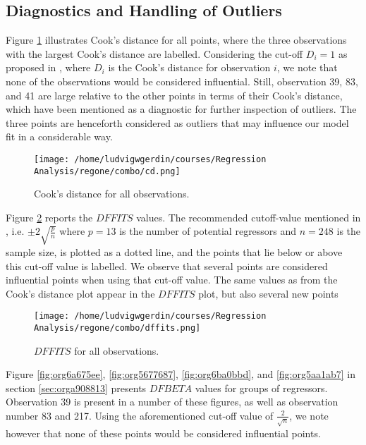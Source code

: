 \documentclass[11pt]{article}
\begin{document}
\subsection{Diagnostics and Handling of Outliers}
\label{sec:orgf5bd8bc}

Figure \ref{fig:org37783fd} illustrates Cook's distance for all points, where the three observations with the largest 
Cook's distance are labelled. Considering the cut-off \(D_i = 1\) as proposed in \cite{Montgomery2012}, 
where \(D_i\) is the Cook's distance for observation \(i\), we note that none of the observations would be 
considered influential. Still, observation 39, 83, and 41 are large relative
to the other points in terms of their Cook's distance, which have been mentioned as a diagnostic for further
inspection of outliers. \cite{Fox1991} The three points are henceforth considered as outliers that may
influence our model fit in a considerable way.

\begin{figure}[h]
\centering
\texttt{[image: /home/ludvigwgerdin/courses/Regression Analysis/regone/combo/cd.png]}
\caption{\label{fig:org37783fd}
Cook's distance for all observations.}
\end{figure}

Figure \ref{fig:orgab48e78} reports the \(DFFITS\) values. 
The recommended cutoff-value mentioned in \cite{Montgomery2012}, i.e. \(\pm 2\sqrt{\frac{p}{n}}\)
where \(p = 13\) is the number of potential regressors and \(n = 248\) is the sample size, is 
plotted as a dotted line, and the points that lie below or above this cut-off value is labelled.
We observe that several points are considered influential points when using that cut-off value.
The same values as from the Cook's distance plot appear in the \(DFFITS\) plot, but also several 
new points

\begin{figure}[h]
\centering
\texttt{[image: /home/ludvigwgerdin/courses/Regression Analysis/regone/combo/dffits.png]}
\caption{\label{fig:orgab48e78}
\(DFFITS\) for all observations.}
\end{figure}

Figure \ref{fig:org6a675ee}, \ref{fig:org5677687}, \ref{fig:org6ba0bbd}, and
\ref{fig:org5aa1ab7} in section \ref{sec:orga908813} presents \(DFBETA\) values for groups of regressors. 
Observation 39 is present in a number of these figures, as well as observation number 83 and 217. 
Using the aforementioned cut-off value of \(\frac{2}{\sqrt{n}}\), we note however that none of these points
would be considered influential points.
\end{document}
